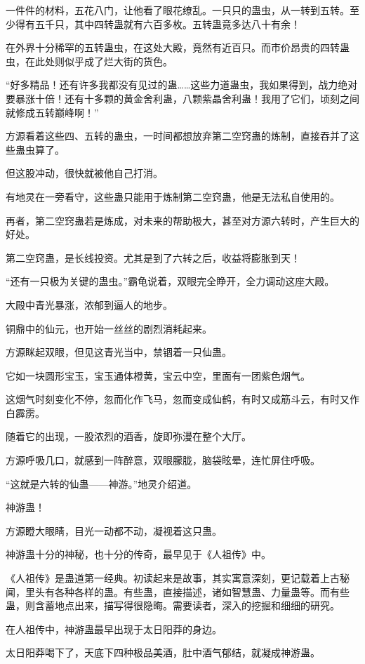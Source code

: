 \begin{this_body}
一件件的材料，五花八门，让他看了眼花缭乱。一只只的蛊虫，从一转到五转。至少得有五千只，其中四转蛊就有六百多枚。五转蛊竟多达八十有余！

在外界十分稀罕的五转蛊虫，在这处大殿，竟然有近百只。而市价昂贵的四转蛊虫，在此处则似乎成了烂大街的货色。

“好多精品！还有许多我都没有见过的蛊……这些力道蛊虫，我如果得到，战力绝对要暴涨十倍！还有十多颗的黄金舍利蛊，八颗紫晶舍利蛊！我用了它们，顷刻之间就修成五转巅峰啊！”

方源看着这些四、五转的蛊虫，一时间都想放弃第二空窍蛊的炼制，直接吞并了这些蛊虫算了。

但这股冲动，很快就被他自己打消。

有地灵在一旁看守，这些蛊只能用于炼制第二空窍蛊，他是无法私自使用的。

再者，第二空窍蛊若是炼成，对未来的帮助极大，甚至对方源六转时，产生巨大的好处。

第二空窍蛊，是长线投资。尤其是到了六转之后，收益将膨胀到天！

“还有一只极为关键的蛊虫。”霸龟说着，双眼完全睁开，全力调动这座大殿。

大殿中青光暴涨，浓郁到逼人的地步。

铜鼎中的仙元，也开始一丝丝的剧烈消耗起来。

方源眯起双眼，但见这青光当中，禁锢着一只仙蛊。

它如一块圆形宝玉，宝玉通体橙黄，宝云中空，里面有一团紫色烟气。

这烟气时刻变化不停，忽而化作飞马，忽而变成仙鹤，有时又成筋斗云，有时又作白霹雳。

随着它的出现，一股浓烈的酒香，旋即弥漫在整个大厅。

方源呼吸几口，就感到一阵醉意，双眼朦胧，脑袋眩晕，连忙屏住呼吸。

“这就是六转的仙蛊——神游。”地灵介绍道。

神游蛊！

方源瞪大眼睛，目光一动都不动，凝视着这只蛊。

神游蛊十分的神秘，也十分的传奇，最早见于《人祖传》中。

《人祖传》是蛊道第一经典。初读起来是故事，其实寓意深刻，更记载着上古秘闻，里头有各种各样的蛊。有些蛊，直接描述，诸如智慧蛊、力量蛊等。而有些蛊，则含蓄地点出来，描写得很隐晦。需要读者，深入的挖掘和细细的研究。

在人祖传中，神游蛊最早出现于太日阳莽的身边。

太日阳莽喝下了，天底下四种极品美酒，肚中酒气郁结，就凝成神游蛊。


\end{this_body}
